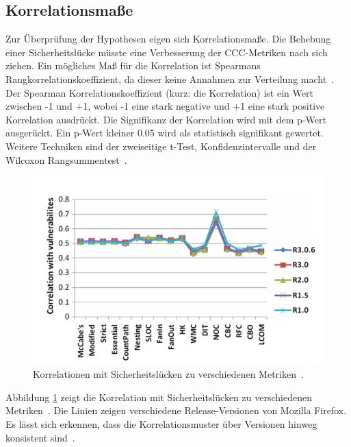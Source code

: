 \subsection{Korrelationsmaße}
Zur Überprüfung der Hypothesen eigen sich Korrelationsmaße.
Die Behebung einer Sicherheitslücke müsste eine Verbesserung der CCC-Metriken nach sich ziehen.
Ein mögliches Maß für die Korrelation ist Spearmans Rangkorrelationskoeffizient, da dieser keine Annahmen zur Verteilung macht~\cite{alves_et_al,chowdhury_zulkernine_2010}.
Der Spearman Korrelationskoeffizient (kurz: die Korrelation) ist ein Wert zwischen -1 und +1, wobei -1 eine stark negative und +1 eine stark positive Korrelation ausdrückt.
Die Signifikanz der Korrelation wird mit dem p-Wert ausgerückt.
Ein p-Wert kleiner 0.05 wird als statistisch signifikant gewertet.
Weitere Techniken sind der zweiseitige t-Test, Konfidenzintervalle und der Wilcoxon Rangsummentest~\cite{alves_et_al}.
\begin{figure}
	\includegraphics[width=\textwidth]{img/vulnerability_correlations.png}
	\caption{Korrelationen mit Sicherheitslücken zu verschiedenen Metriken~\cite{chowdhury_zulkernine_2009}.}
	\label{fig:correlations}
\end{figure}
Abbildung \ref{fig:correlations} zeigt die Korrelation mit Sicherheitslücken zu verschiedenen Metriken~\cite{chowdhury_zulkernine_2009}.
Die Linien zeigen verschiedene Release-Versionen von Mozilla Firefox.
Es lässt sich erkennen, dass die Korrelationsmuster über Versionen hinweg konsistent sind~\cite{chowdhury_zulkernine_2009}.

